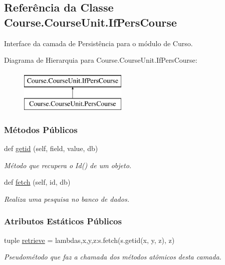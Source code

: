 \hypertarget{classCourse_1_1CourseUnit_1_1IfPersCourse}{}\subsection{Referência da Classe Course.\+Course\+Unit.\+If\+Pers\+Course}
\label{classCourse_1_1CourseUnit_1_1IfPersCourse}


Interface da camada de Persistência para o módulo de Curso.  


Diagrama de Hierarquia para Course.\+Course\+Unit.\+If\+Pers\+Course\+:\begin{figure}[H]
\begin{center}
\leavevmode
\includegraphics[height=2.000000cm]{d0/d62/classCourse_1_1CourseUnit_1_1IfPersCourse}
\end{center}
\end{figure}
\subsubsection*{Métodos Públicos}
\begin{DoxyCompactItemize}
\item 
def \hyperlink{classCourse_1_1CourseUnit_1_1IfPersCourse_ad7318280b436d4c91b00a14e865317ee}{getid} (self, field, value, db)
\begin{DoxyCompactList}\small\item\em Método que recupera o Id() de um objeto. \end{DoxyCompactList}\item 
def \hyperlink{classCourse_1_1CourseUnit_1_1IfPersCourse_a41c931a6cdf9184ca2aa3cfde7cd706a}{fetch} (self, id, db)
\begin{DoxyCompactList}\small\item\em Realiza uma pesquisa no banco de dados. \end{DoxyCompactList}\end{DoxyCompactItemize}
\subsubsection*{Atributos Estáticos Públicos}
\begin{DoxyCompactItemize}
\item 
tuple \hyperlink{classCourse_1_1CourseUnit_1_1IfPersCourse_ae7dca869bdb9f9db07ce55bf78991aae}{retrieve} = lambdas,x,y,z\+:s.\+fetch(s.\+getid(x, y, z), z)
\begin{DoxyCompactList}\small\item\em Pseudométodo que faz a chamada dos métodos atômicos desta camada. \end{DoxyCompactList}\end{DoxyCompactItemize}


